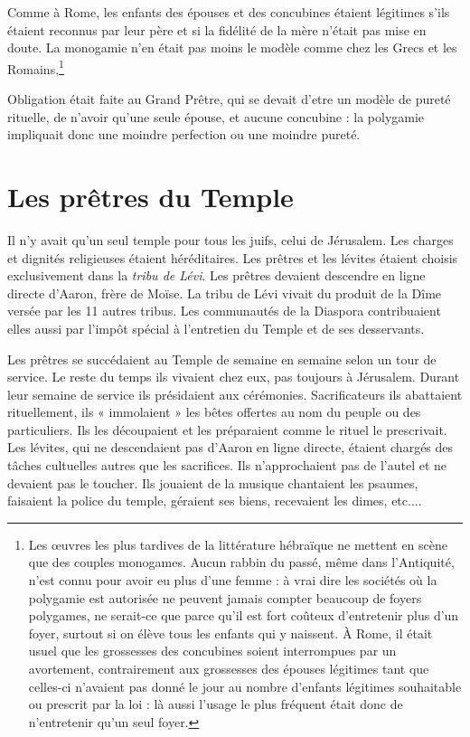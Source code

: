 Comme à Rome, les enfants des épouses et des concubines étaient légitimes s'ils étaient reconnus par leur père et si la fidélité de la mère n'était pas mise en doute. La monogamie n'en était pas moins le modèle comme chez les Grecs et les Romains,\footnote{Les œuvres les plus tardives de la littérature hébraïque ne mettent en scène que des couples monogames. Aucun rabbin du passé, même dans l'Antiquité, n'est connu pour avoir eu plus d'une femme : à vrai dire les sociétés où la polygamie est autorisée ne peuvent jamais compter beaucoup de foyers polygames, ne serait-ce que parce qu'il est fort coûteux d'entretenir plus d'un foyer, surtout si on élève tous les enfants qui y naissent. À Rome, il était usuel que les grossesses des concubines soient interrompues par un avortement, contrairement aux grossesses des épouses légitimes tant que celles-ci n'avaient pas donné le jour au nombre d'enfants légitimes souhaitable ou prescrit par la loi : là aussi l'usage le plus fréquent était donc de n'entretenir qu'un seul foyer.}%

 Obligation était faite au Grand Prêtre, qui se devait d'etre un modèle de pureté rituelle, de n'avoir qu'une seule épouse, et aucune concubine : la polygamie impliquait donc une moindre perfection ou une moindre pureté. 
 
 



\section{Les prêtres du Temple}

 Il n'y avait qu'un seul temple pour tous les juifs, celui de Jérusalem. Les charges et dignités religieuses étaient héréditaires. Les prêtres et les lévites étaient choisis exclusivement dans la \emph{tribu de Lévi}. Les prêtres devaient descendre en ligne directe d'Aaron, frère de Moïse. La tribu de Lévi vivait du produit de la Dîme versée par les 11 autres tribus. Les communautés de la Diaspora contribuaient elles aussi par l'impôt spécial  à l'entretien du Temple et de ses desservants. 

 Les prêtres se succédaient au Temple de semaine en semaine selon un tour de service. Le reste du temps ils vivaient chez eux, pas toujours à Jérusalem. Durant leur semaine de service ils présidaient aux cérémonies. Sacrificateurs ils abattaient rituellement, ils « immolaient » les bêtes offertes au nom du peuple ou des particuliers. Ils les découpaient et les préparaient comme le rituel le prescrivait. 
  Les lévites, qui ne descendaient pas d'Aaron en ligne directe, étaient chargés des tâches cultuelles autres que les sacrifices. Ils n'approchaient pas de l'autel et ne devaient pas le toucher. Ils jouaient de la musique chantaient les psaumes, faisaient la police du temple, géraient ses biens, recevaient les dimes, etc....

